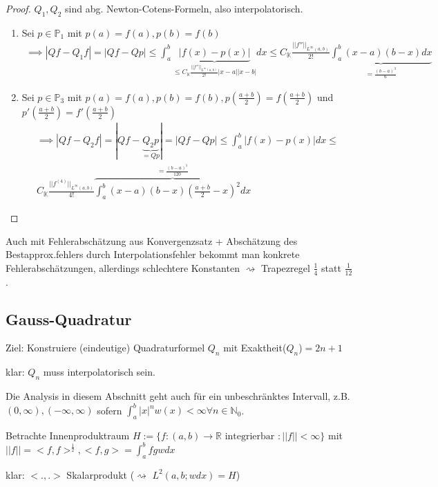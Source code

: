\begin{proof}
	$Q_1, Q_2$ sind abg. Newton-Cotens-Formeln, also interpolatorisch.
	\begin{enumerate}
		\item Sei $p \in \mathbb{P}_1$ mit $p(a)=f(a), p(b)=f(b)$
		\begin{align*}
			\implies |Qf - Q_1f| = |Qf - Qp| \leq \int_{a}^{b} \underbrace{|f(x) - p(x)|}_{\leq C_{\mathbb{K}} \frac{||f''||_{L^\infty(a,b)}}{2!} |x-a| |x-b|} dx \leq
			C_{\mathbb{K}} \frac{||f''||_{L^\infty(a,b)}}{2!} \underbrace{\int_{a}^{b}(x-a)(b-x) dx}_{= \frac{(b-a)^3}{6}}
		\end{align*}
		\item Sei $p \in \mathbb{P}_3$ mit $p(a)=f(a), p(b)=f(b), p\left(\frac{a+b}{2}\right) = f\left(\frac{a+b}{2}\right)$ und $p'\left(\frac{a+b}{2}\right) = f'\left(\frac{a+b}{2}\right)$
		\begin{align*}
			\implies |Qf - Q_2f| = |Qf - \underbrace{Q_2p}_{=Qp}| = |Qf - Qp| \leq \int_{a}^{b} |f(x) - p(x)| dx \leq\\
			C_{\mathbb{K}} \frac{||f^{(4)}||_{L^\infty(a,b)}}{4!} \overbrace{\int_{a}^{b} (x-a)(b-x) \left(\frac{a+b}{2} - x\right)^2 dx}^{=\frac{(b-a)^5}{120}}
		\end{align*}
	\end{enumerate}
\end{proof}

\begin{remark}
	Auch mit Fehlerabschätzung aus Konvergenzsatz + Abschätzung des Bestapprox.fehlers durch Interpolationsfehler bekommt man konkrete Fehlerabschätzungen, allerdings schlechtere Konstanten $\rightsquigarrow$ Trapezregel $\frac{1}{4}$ statt $\frac{1}{12}$.
\end{remark}

\subsection{Gauss-Quadratur}

Ziel: Konstruiere (eindeutige) Quadraturformel $Q_n$ mit Exaktheit($Q_n$)$=2n+1$

klar: $Q_n$ muss interpolatorisch sein.

\begin{remark}
	Die Analysis in diesem Abschnitt geht auch für ein unbeschränktes Intervall, z.B. $(0, \infty), (-\infty, \infty)$ sofern $\int_{a}^{b} |x|^n w(x) < \infty \forall n \in \mathbb{N}_0$.
	
	Betrachte Innenproduktraum $H := \{f:(a,b) \rightarrow \mathbb{R} \text{ integrierbar }: ||f|| < \infty\}$ mit $||f|| = <f,f>^{\frac{1}{2}}, <f,g> = \int_{a}^{b} fgw dx$
	
	klar: $<., .>$ Skalarprodukt ($\rightsquigarrow$ $L^2(a,b;wdx) = H$)
\end{remark}

